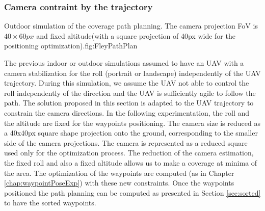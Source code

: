  \subsubsection{Camera contraint by the trajectory} \label{sec:holonomie path}
  \begin{mfigures}[!]{Outdoor simulation of the coverage path planning. The camera projection FoV is $40 \times 60 px$  and fixed altitude(with  a square projection of 40px wide for the positioning optimization).}{fig:FleyPathPlan} \centering
\hspace{1cm}
\tabsimuposeFleyPathHolonom
\end{mfigures} 

The previous indoor or outdoor simulations assumed to have an UAV with a camera stabilization for the roll (portrait or landscape) independently of the UAV trajectory.
During this simulation, we assume the UAV not able to control the roll independently of the direction and the UAV is sufficiently agile to follow the path.
The solution proposed in this section is adapted to the UAV trajectory to constrain the camera directions. 
In the following experimentation, the roll and the altitude are fixed for the waypoints positioning. The camera size is reduced as a 40x40px square shape projection onto the ground, corresponding to the smaller side of the camera projections. The camera is represented as a reduced square used only for the optimization process.
 The reduction of the camera estimation, the fixed roll and also a fixed altitude allows us to make a coverage at minima of the area.
The optimization of the waypoints are computed (as in Chapter \ref{chap:waypointPoseExp}) with these new constraints. Once the waypoints positioned  
the path planning can be computed as presented in Section \ref{sec:sorted} to have the sorted waypoints.

